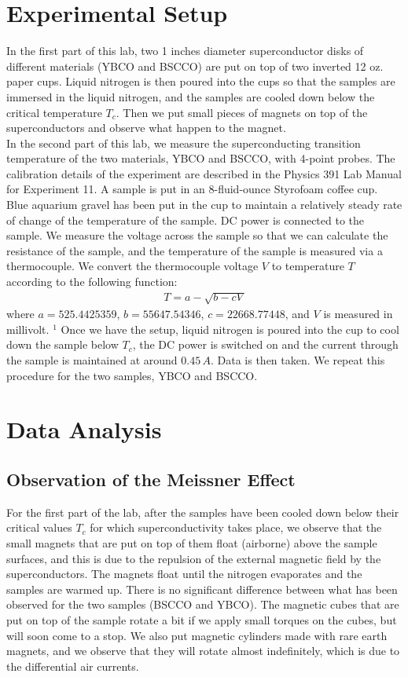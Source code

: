 \documentclass[11pt]{book}
\theoremstyle{break}
\theoremstyle{break}
\begin{document}
\section{Experimental Setup}
In the first part of this lab, two 1 inches diameter superconductor disks of different materials (YBCO and BSCCO) are put on top of two inverted  12  oz. paper cups. Liquid nitrogen is then poured into the cups so that the samples are immersed in the liquid nitrogen, and the samples are cooled down below the critical temperature $T_c$. Then we put small pieces of magnets on top of the superconductors and observe what happen to the magnet.\\

In the second part of this lab, we measure the superconducting transition temperature of the two materials, YBCO and BSCCO, with 4-point probes. The calibration details of the experiment are described in the Physics 391 Lab Manual for Experiment 11. A sample is put in an 8-fluid-ounce Styrofoam coffee cup. Blue aquarium gravel has been put in the cup to maintain a relatively steady rate of change of the temperature of the sample. DC power is connected to the sample. We measure the voltage across the sample so that we can calculate the resistance of the sample, and the temperature of the sample is measured via a thermocouple. We convert the thermocouple voltage $V$ to temperature $T$ according to the following function:
\begin{align}
T = a-\sqrt{b-cV}
\end{align}
where $a=525.4425359$, $b=55647.54346$, $c=22668.77448$, and $V$ is measured in millivolt. $^1$ Once we have the setup, liquid nitrogen is poured into the cup to cool down the sample below $T_c$, the DC power is switched on and the current through the sample is maintained at around $0.45\, A$. Data is then taken. We repeat this procedure for the two samples, YBCO and BSCCO.

\section{Data Analysis}
\subsection{Observation of the Meissner Effect}
For the first part of the lab, after the samples have been cooled down below their critical values $T_c$ for which superconductivity takes place, we observe that the small magnets that are put on top of them float (airborne) above the sample surfaces, and this is due to the repulsion of the external magnetic field by the superconductors. The magnets float until the nitrogen evaporates and the samples are warmed up. There is no significant difference between what has been observed for the two samples (BSCCO and YBCO). The magnetic cubes that are put on top of the sample rotate a bit if we apply small torques on the cubes, but will soon come to a stop. We also put magnetic cylinders made with rare earth magnets, and we observe that they will rotate almost indefinitely, which is due to the differential air currents. \\
\end{document}
